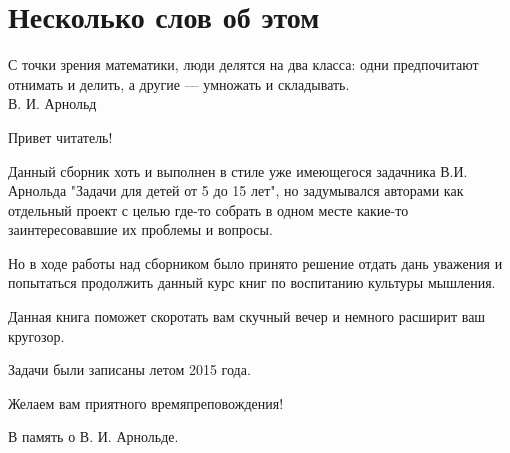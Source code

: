 \chapter*{Несколько слов об этом}

\begin{flushright}
{\scriptsize С точки зрения математики, люди делятся на два класса: одни предпочитают отнимать и делить, а другие — умножать и складывать.\\
В. И. Арнольд}
\end{flushright}

    Привет читатель! 
    
    
    Данный сборник хоть и выполнен в стиле уже имеющегося задачника
В.И. Арнольда "Задачи для детей от 5 до 15 лет", но задумывался 
авторами как отдельный проект с целью где-то собрать в одном месте 
какие-то заинтересовавшие их проблемы и вопросы.


Но в ходе работы над сборником было принято решение отдать дань 
уважения и попытаться продолжить данный курс книг по воспитанию 
культуры мышления.


Данная книга поможет скоротать вам скучный вечер и немного расширит ваш кругозор.
    
Задачи были записаны летом 2015 года.
    
Желаем вам приятного времяпреповождения!


В память о В. И. Арнольде.
